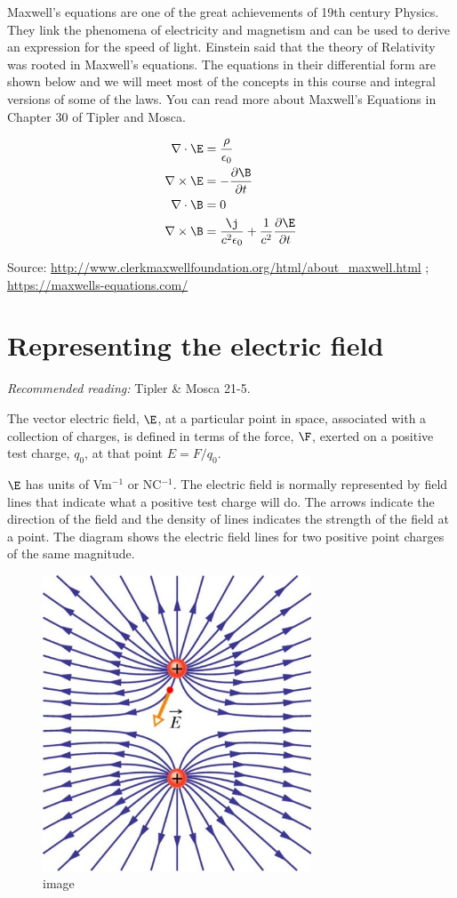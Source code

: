 \documentclass[
]{book}
\begin{document}
Maxwell's equations are one of the great achievements of 19th century
Physics. They link the phenomena of electricity and magnetism and can be
used to derive an expression for the speed of light. Einstein said that
the theory of Relativity was rooted in Maxwell's equations. The
equations in their differential form are shown below and we will meet
most of the concepts in this course and integral versions of some of the
laws. You can read more about Maxwell's Equations in Chapter 30 of
Tipler and Mosca.

\[\begin{aligned}
\nabla \cdot \E &= \frac{\rho}{\epsilon_0} \\ 
\nabla \times \E &= - \frac{\partial \B}{\partial t} \\
\nabla \cdot \B &= 0 \\
\nabla \times \B &= \frac{\j}{c^2 \epsilon_0} + \frac{1}{c^2} \frac{\partial \E}{\partial t}
\end{aligned}\]

Source: \url{http://www.clerkmaxwellfoundation.org/html/about_maxwell.html}
; \url{https://maxwells-equations.com/}

\hypertarget{representing-the-electric-field}{%
\section{Representing the electric field}\label{representing-the-electric-field}}

\emph{Recommended reading:} Tipler \& Mosca 21-5.

The vector electric field, \(\E\), at a particular point in space,
associated with a collection of charges, is defined in terms of the
force, \(\F\), exerted on a positive test charge, \(q_0\), at that point
\(E = F/q_0\).

\(\E\) has units of Vm\(^{-1}\) or NC\(^{-1}\). The electric field is normally
represented by field lines that indicate what a positive test charge
will do. The arrows indicate the direction of the field and the density
of lines indicates the strength of the field at a point. The diagram
shows the electric field lines for two positive point charges of the
same magnitude.

\begin{figure}
\centering
\includegraphics[width=80mm,height=\textheight]{Figures/Efield_like.jpg}
\caption{image}
\end{figure}
\end{document}
